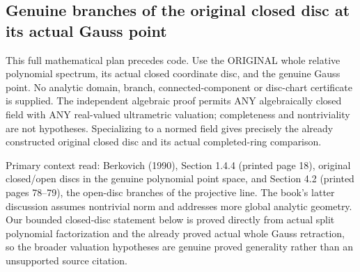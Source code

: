 \subsection{Genuine branches of the original closed disc at its actual Gauss point}

This full mathematical plan precedes code. Use the ORIGINAL whole relative
polynomial spectrum, its actual closed coordinate disc, and the genuine
Gauss point. No analytic domain, branch, connected-component or disc-chart
certificate is supplied. The independent algebraic proof permits ANY
algebraically closed field with ANY real-valued ultrametric valuation;
completeness and nontriviality are not hypotheses. Specializing to a normed
field gives precisely the already constructed original closed disc and its
actual completed-ring comparison.

Primary context read: Berkovich (1990), Section 1.4.4 (printed page 18),
original closed/open discs in the genuine polynomial point space, and
Section 4.2 (printed pages 78--79), the open-disc branches of the projective
line. The book's latter discussion assumes nontrivial norm and addresses
more global analytic geometry. Our bounded closed-disc statement below is
proved directly from actual split polynomial factorization and the already
proved actual whole Gauss retraction, so the broader valuation hypotheses
are genuine proved generality rather than an unsupported source citation.

